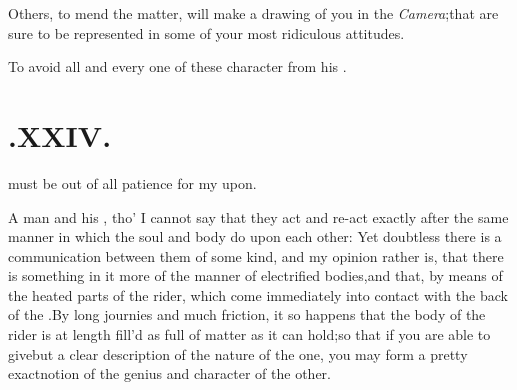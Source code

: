 \documentclass{article}
\begin{document}
Others, to mend the matter, will make a drawing of you in the
\textit{Camera};\tsk that\break
{}
are sure to be represented in some of your most
ridiculous attitudes.

To avoid all and every one of these
character from his .


\null
\section{.\enspace XXIV.}

  must be out of all patience for my\break
{}
\break 
upon.

A man and his ,\break
tho’ I cannot say that they act and re-act exactly after the
same manner in which the soul and body do upon each other: Yet
doubtless there is a communication between them of some kind, and
my\break
opinion rather is, that there is something in it more of the
manner of electrified bodies,\tsk and that, by means of the
heated parts of the rider, which come immediately into contact with
the back of the .\tsk By
long journies and much friction, it so happens that the bo\-dy of
the rider is at length fill’d as full of
 matter as it can
hold;\tsk so that if you are able to give\break but a clear description of the nature
of the one, you may form a pretty exact\break notion of the genius and
character of the other.
\end{document}
